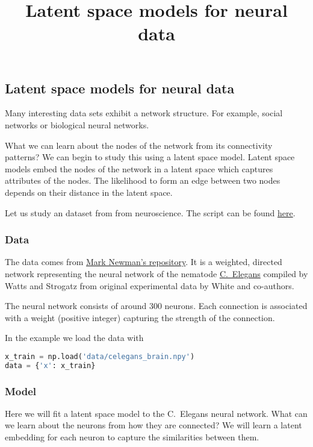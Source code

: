 \title{Latent space models for neural data}

\subsection{Latent space models for neural data}

Many interesting data sets exhibit a network structure. For example, social
networks or biological neural networks.

What we can learn about the nodes of the network from its connectivity patterns?
We can begin to study this using a latent space model.
Latent space models embed the nodes of the network in a latent space which
captures attributes of the nodes. The likelihood to form an edge between two
nodes depends on their distance in the latent space.

Let us study an dataset from from neuroscience.
The script can be found
\href{https://github.com/blei-lab/edward/blob/master/examples/latent_space_model.py}{here}.

\subsubsection{Data}

The data comes from \href{http://www-personal.umich.edu/~mejn/netdata/}{Mark Newman's repository}.
It is a weighted, directed network representing the neural network of
the nematode
\href{https://en.wikipedia.org/wiki/Caenorhabditis_elegans}{C.~Elegans}
compiled by Watts and Strogatz from original experimental data
by White and co-authors.

The neural network consists of around $300$ neurons. Each connection
is associated with a weight (positive integer) capturing the strength
of the connection.

In the example we load the data with
\begin{lstlisting}[language=Python]
x_train = np.load('data/celegans_brain.npy')
data = {'x': x_train}
\end{lstlisting}

\subsubsection{Model}

Here we will fit a latent space model to the C.~Elegans neural network. What can
we learn about the neurons from how they are connected? We will learn a latent
embedding for each neuron to capture the similarities between them.

